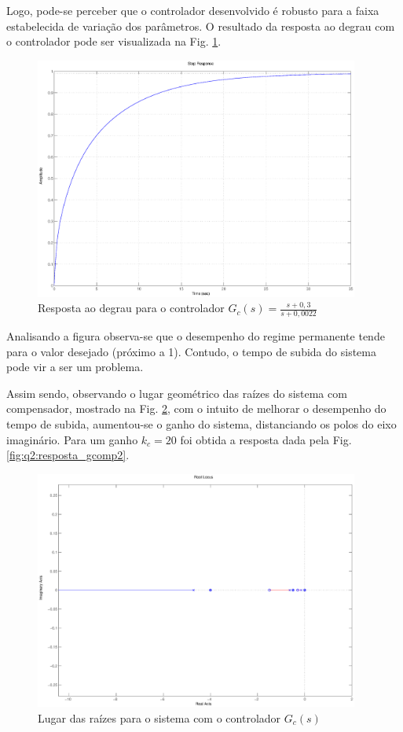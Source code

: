 Logo, pode-se perceber que o controlador desenvolvido é robusto para a faixa
estabelecida de variação dos parâmetros. O resultado da resposta ao degrau com o
controlador pode ser visualizada na Fig. \ref{fig:q2:resposta_gcomp1}.
 
\begin{figure}[htb]
\centering
\includegraphics[width=0.95\textwidth]{imgs/questao2/resposta_gcomp1}
\caption{Resposta ao degrau para o controlador $G_c(s) = \frac{s+0,3}{s+0,0022}$}
\label{fig:q2:resposta_gcomp1}
\end{figure}

Analisando a figura observa-se que o desempenho do regime permanente tende para
o valor desejado (próximo a 1). Contudo, o tempo de subida do sistema pode vir a
ser um problema.

Assim sendo, observando o lugar geométrico das raízes do sistema com
compensador, mostrado na Fig. \ref{fig:q2:rlocus_gcomp1}, com o intuito de
melhorar o desempenho do tempo de subida, aumentou-se o ganho do sistema,
distanciando os polos do eixo imaginário. Para um ganho $k_c = 20$ foi obtida a
resposta dada pela Fig. \ref{fig:q2:resposta_gcomp2}.

\begin{figure}[H]
\centering
\includegraphics[width=0.95\textwidth]{imgs/questao2/rlocus_gcma}
\caption{Lugar das raízes para o sistema com o controlador $G_c(s)$}
\label{fig:q2:rlocus_gcomp1}
\end{figure}
 
